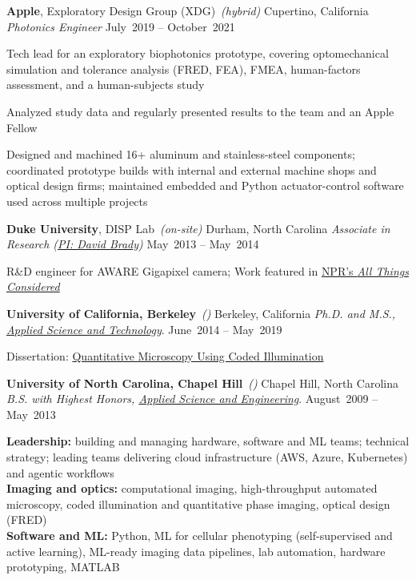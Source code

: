 \documentclass[12pt,letterpaper]{article}
\newenvironment{itemize*}%
{\begin{itemize}%
  \setlength{\itemsep}{0pt}}%
{\end{itemize}}
\newcommand{\mhead}[1]{\leavevmode\marginpar{\raggedright\sffamily\footnotesize #1}}
\newcommand{\rdate}[1]{{} \hfill #1}
\newcommand{\entryhead}[3][]{{\large #2}\if\relax\detokenize{#1}\relax\else\ \textit{(#1)}\fi\rdate{#3}}
\begin{document}
\smallskip
\entryhead[hybrid]{\textbf{Apple}, Exploratory Design Group (XDG)}{Cupertino, California}\newline
\emph{Photonics Engineer}  \rdate{{July~2019 -- October~2021}}
\begin{itemize*}
  \item Tech lead for an exploratory biophotonics prototype, covering optomechanical simulation and tolerance analysis (FRED, FEA), FMEA, human-factors assessment, and a human-subjects study
  \item Analyzed study data and regularly presented results to the team and an Apple Fellow
  \item Designed and machined 16+ aluminum and stainless-steel components; coordinated prototype builds with internal and external machine shops and optical design firms; maintained embedded and Python actuator-control software used across multiple projects
\end{itemize*}

\smallskip
\entryhead[on-site]{\textbf{Duke University}, DISP Lab}{Durham, North Carolina}\newline
\emph{Associate in Research (\href{http://www.disp.duke.edu/}{PI: David Brady}) } \rdate{May~2013 -- May~2014}
\begin{itemize*}
	\item R\&D engineer for AWARE Gigapixel camera; Work featured in \href{http://www.npr.org/2013/12/10/250000359/supercamera-more-pixels-than-you-know-what-to-do-with}{NPR's \textit{All Things Considered}}
\end{itemize*}

\medskip
\mhead{Education}%
\entryhead{\textbf{University of California, Berkeley}}{Berkeley, California}\newline
\emph{Ph.D. and M.S., \href{http://ast.coe.berkeley.edu/}{Applied Science and Technology}}. \rdate{June~2014 -- May~2019}
\begin{itemize*}
  \item Dissertation: \href{https://escholarship.org/uc/item/70d9j190}{Quantitative Microscopy Using Coded Illumination}
\end{itemize*}

\smallskip
\entryhead{\textbf{University of North Carolina, Chapel Hill}}{Chapel Hill, North Carolina}\newline
\emph{B.S. with Highest Honors, \href{https://www.bme.unc.edu/}{Applied Science and Engineering}}. \rdate{August~2009 -- May~2013}


\smallskip
\mhead{Tools and \newline Expertise}%
\textbf{Leadership:} building and managing hardware, software and ML teams; technical strategy; leading teams delivering cloud infrastructure (AWS, Azure, Kubernetes) and agentic workflows \\
\textbf{Imaging and optics:} computational imaging, high-throughput automated microscopy, coded illumination and quantitative phase imaging, optical design (FRED) \\
\textbf{Software and ML:} Python, ML for cellular phenotyping (self-supervised and active learning), ML-ready imaging data pipelines, lab automation, hardware prototyping, MATLAB
\end{document}
